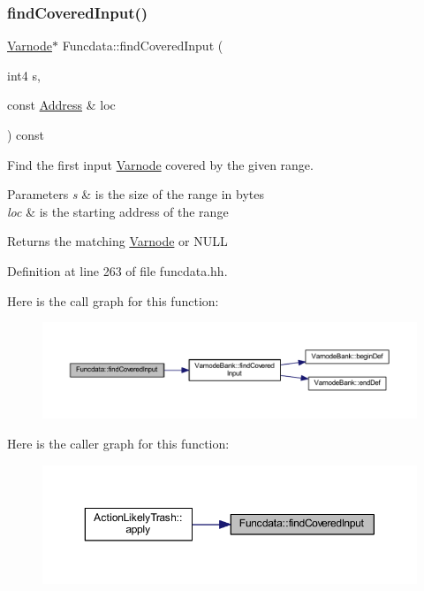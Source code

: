 \subsubsection{\texorpdfstring{findCoveredInput()}{findCoveredInput()}}
{\footnotesize\ttfamily \mbox{\hyperlink{class_varnode}{Varnode}}$\ast$ Funcdata\+::find\+Covered\+Input (\begin{DoxyParamCaption}\item[{int4}]{s,  }\item[{const \mbox{\hyperlink{class_address}{Address}} \&}]{loc }\end{DoxyParamCaption}) const\hspace{0.3cm}{\ttfamily [inline]}}



Find the first input \mbox{\hyperlink{class_varnode}{Varnode}} covered by the given range. 


\begin{DoxyParams}{Parameters}
{\em s} & is the size of the range in bytes \\
\hline
{\em loc} & is the starting address of the range \\
\hline
\end{DoxyParams}
\begin{DoxyReturn}{Returns}
the matching \mbox{\hyperlink{class_varnode}{Varnode}} or N\+U\+LL 
\end{DoxyReturn}


Definition at line 263 of file funcdata.\+hh.

Here is the call graph for this function\+:
\nopagebreak
\begin{figure}[H]
\begin{center}
\leavevmode
\includegraphics[width=350pt]{class_funcdata_a8fa3242779be4a766a37227deb728836_cgraph}
\end{center}
\end{figure}
Here is the caller graph for this function\+:
\nopagebreak
\begin{figure}[H]
\begin{center}
\leavevmode
\includegraphics[width=350pt]{class_funcdata_a8fa3242779be4a766a37227deb728836_icgraph}
\end{center}
\end{figure}
\mbox{\label{class_funcdata_a6461d0bee74dda24aafa2caa40d0fee7}} 
